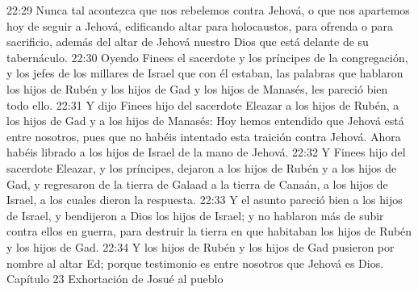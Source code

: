 22:29 Nunca tal acontezca que nos rebelemos contra Jehová, o que nos apartemos hoy de seguir a Jehová, edificando altar para holocaustos, para ofrenda o para sacrificio, además del altar de Jehová nuestro Dios que está delante de su tabernáculo.  
22:30 Oyendo Finees el sacerdote y los príncipes de la congregación, y los jefes de los millares de Israel que con él estaban, las palabras que hablaron los hijos de Rubén y los hijos de Gad y los hijos de Manasés, les pareció bien todo ello.  
22:31 Y dijo Finees hijo del sacerdote Eleazar a los hijos de Rubén, a los hijos de Gad y a los hijos de Manasés: Hoy hemos entendido que Jehová está entre nosotros, pues que no habéis intentado esta traición contra Jehová. Ahora habéis librado a los hijos de Israel de la mano de Jehová.  
22:32 Y Finees hijo del sacerdote Eleazar, y los príncipes, dejaron a los hijos de Rubén y a los hijos de Gad, y regresaron de la tierra de Galaad a la tierra de Canaán, a los hijos de Israel, a los cuales dieron la respuesta.  
22:33 Y el asunto pareció bien a los hijos de Israel, y bendijeron a Dios los hijos de Israel; y no hablaron más de subir contra ellos en guerra, para destruir la tierra en que habitaban los hijos de Rubén y los hijos de Gad.  
22:34 Y los hijos de Rubén y los hijos de Gad pusieron por nombre al altar Ed; porque testimonio es entre nosotros que Jehová es Dios.  
Capítulo 23
Exhortación de Josué al pueblo  

